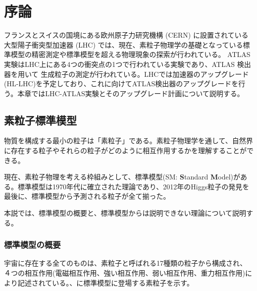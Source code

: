 \chapter{序論}
\label{sec:josho}

フランスとスイスの国境にある欧州原子力研究機構 (CERN) に設置されている大型陽子衝突型加速器 (LHC) では、現在、素粒子物理学の基礎となっている標準模型の精密測定や標準模型を超える物理現象の探索が行われている。 ATLAS実験はLHC上にある4つの衝突点の1つで行われている実験であり、ATLAS 検出器を用いて 生成粒子の測定が行われている。LHCでは加速器のアップグレード(HL-LHC)を予定しており、これに向けてATLAS検出器のアップグレードを行う。本章ではLHC-ATLAS実験とそのアップグレード計画について説明する。



\section{素粒子標準模型}
\label{sec:soryuushi}
物質を構成する最小の粒子は「素粒子」である。素粒子物理学を通して、自然界に存在する粒子やそれらの粒子がどのように相互作用するかを理解することができる。

現在、素粒子物理を考える枠組みとして、標準模型(SM: \textbf{S}tandard \textbf{M}odel)がある。標準模型は1970年代に確立された理論であり、2012年のHiggs粒子の発見を最後に、標準模型から予測される粒子が全て揃った。

本説では、標準模型の概要と、標準模型からは説明できない理論について説明する。


\subsection{標準模型の概要}
\label{sec:sm}

宇宙に存在する全てのものは、素粒子と呼ばれる17種類の粒子から構成され、４つの相互作用(電磁相互作用、強い相互作用、弱い相互作用、重力相互作用)により記述されている。、に標準模型に登場する素粒子を示す。

